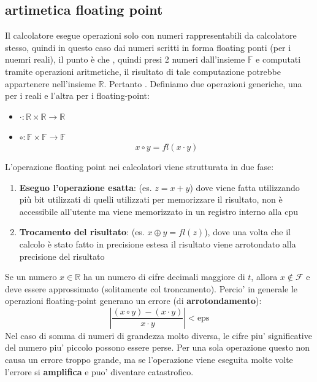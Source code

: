 \subsection{artimetica floating point}
Il calcolatore esegue operazioni solo con numeri rappresentabili da calcolatore stesso, quindi in questo caso dai numeri scritti in forma floating ponti (per i nuemri reali), il punto è che , quindi presi 2 numeri dall'insieme $\mathbb{F}$ e computati tramite operazioni aritmetiche, il risultato di tale computazione potrebbe appartenere nell'insieme $\mathbb{R}$. Pertanto . Definiamo due operazioni generiche, una per i reali e l'altra per i floating-point:
\begin{itemize}
\item $ \cdot: \mathbb{R} \times \mathbb{R} \to \mathbb{R} $
\item $ \circ: \mathbb{F} \times \mathbb{F} \to \mathbb{F} $
  \[
    x \circ y = fl(x \cdot y)
  \]
\end{itemize}
L'operazione floating point nei calcolatori viene strutturata in due fase:
\begin{enumerate}
    \item \textbf{Eseguo l'operazione esatta}: (es. $z=x+y$) dove viene fatta utilizzando più bit utilizzati di quelli utilizzati per memorizzare il risultato, non è accessibile all'utente ma viene memorizzato in un registro interno alla cpu
    \item \textbf{Trocamento del risultato}: (es. $x\oplus y = fl(z)$), dove una volta che il calcolo è stato fatto in precisione estesa il risultato viene arrotondato alla precisione del risultato
\end{enumerate}

Se un numero $ x \in \mathbb{R} $ ha un numero di cifre decimali maggiore di $ t $, allora $ x \not\in \mathcal{F} $ e deve essere approssimato (solitamente col troncamento).
Percio' in generale le operazioni floating-point generano un errore (di \textbf{arrotondamento}):
\[
  \left|\frac{(x \circ y) - (x \cdot y)}{x \cdot y}\right| < \text{eps}
\]  
Nel caso di somma di numeri di grandezza molto diversa, le cifre piu' significative del numero piu' piccolo possono essere perse. Per una sola operazione questo non causa un errore troppo grande, ma se l'operazione viene eseguita molte volte l'errore si \textbf{amplifica} e puo' diventare catastrofico.


